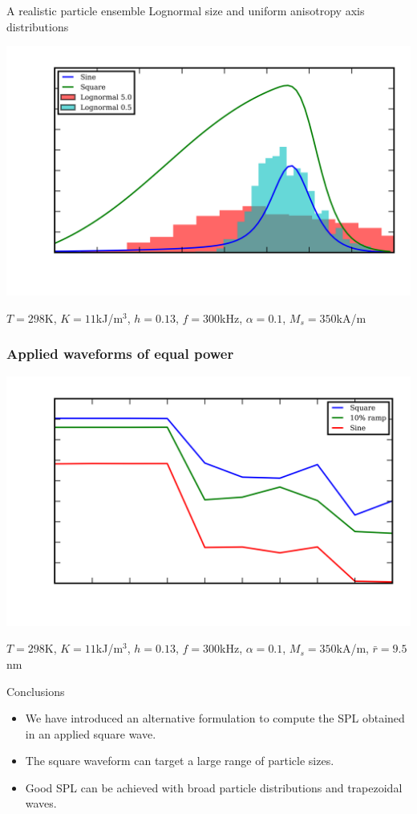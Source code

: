 \documentclass{sotonbeamer}
\begin{document}
\begin{frame}{A realistic particle ensemble}
Lognormal size and uniform anisotropy axis distributions
  \begin{center}
    \includegraphics{figures/dist.png}
  \end{center}
\vspace{-3mm}
{\tiny $T=298$K, $K=11$kJ/m$^3$, $h=0.13$, $f=300$kHz, $\alpha=0.1$, $M_s=350$kA/m}
\end{frame}

\begin{frame}
  \frametitle{Applied waveforms of equal power}
  \begin{center}
    \includegraphics{figures/distsweep.png}
  \end{center}
\vspace{-3mm}
{\tiny $T=298$K, $K=11$kJ/m$^3$, $h=0.13$, $f=300$kHz,
  $\alpha=0.1$, $M_s=350$kA/m, $\bar{r}=9.5$nm}
\end{frame}

\begin{frame}{Conclusions}
  \begin{itemize}
  \item We have introduced an alternative formulation to compute the
    SPL obtained in an applied square wave.
  \item The square waveform can target a large range of particle sizes.
  \item Good SPL can be achieved with broad particle distributions and
    trapezoidal waves.
  \end{itemize}
\end{frame}
\end{document}
